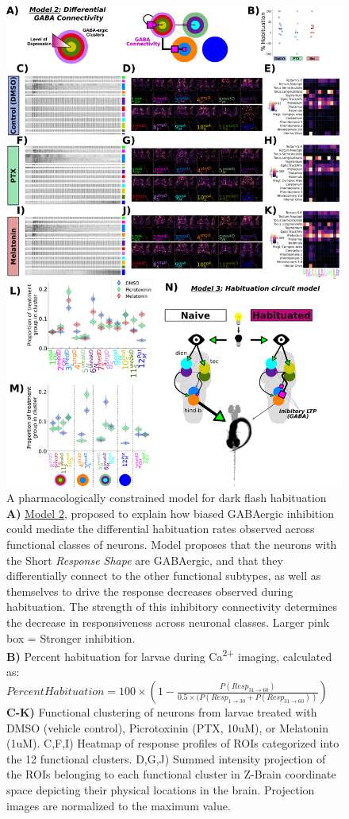 \documentclass[9pt,lineno]{RandlettLab_elife}
\begin{document}
\begin{figure}
\begin{fullwidth}
\begin{center}
\includegraphics[width=0.6\linewidth]{Figure8 - Drugs.png}
\caption{
A pharmacologically constrained model for dark flash habituation
\\ \textbf{A)} \underline{Model 2}, proposed to explain how biased GABAergic inhibition could mediate the differential habituation rates observed across functional classes of neurons. Model proposes that the neurons with the Short \emph{Response Shape} are GABAergic, and that they differentially connect to the other functional subtypes, as well as themselves to drive the response decreases observed during habituation. The strength of this inhibitory connectivity determines the decrease in responsiveness across neuronal classes. Larger pink box = Stronger inhibition. 
\\ \textbf{B)} Percent habituation for larvae during Ca\textsuperscript{2+} imaging, calculated as:
$Percent Habituation = 
100 \times (1 - \frac{P(Resp_{31\rightarrow60})}{0.5 \times (P(Resp_{1\rightarrow30} + P(Resp_{31\rightarrow60}))})$
\\ \textbf{C-K)} Functional clustering of neurons from larvae treated with DMSO (vehicle control), Picrotoxinin (PTX, 10uM), or Melatonin (1uM). 
C,F,I) Heatmap of response profiles of ROIs categorized into the 12 functional clusters. 
D,G,J) Summed intensity projection of the ROIs belonging to each functional cluster in Z-Brain coordinate space depicting their physical locations in the brain. Projection images are normalized to the maximum value. 
}
\end{center}
\end{fullwidth}
\end{figure}
\end{document}
